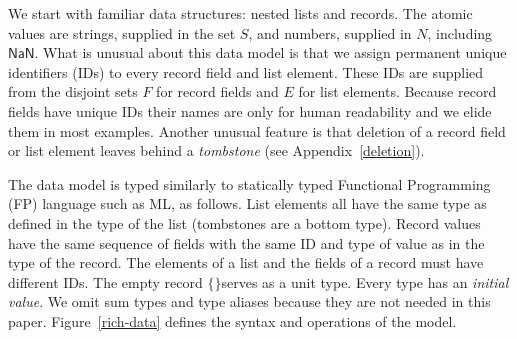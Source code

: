 \documentclass[english,submission]{programming}
\theoremstyle{definition}
\newtheorem*{remark}{Remark}
\newcommand{\mathbox}[1]{\colorbox{black!10}{$#1$\phantom{i\hspace{-3.5pt}}}}
\begin{document}
We start with familiar data structures: nested lists and records. The atomic values are strings, supplied in the set \mathbox{S}, and numbers, supplied in \mathbox{N}, including \mathbox{\textsf{NaN}}. What is unusual about this data model is that we assign permanent unique identifiers (IDs) to every record field and list element. These IDs are supplied from the disjoint sets \mathbox{F} for record fields and \mathbox{E} for list elements. Because record fields have unique IDs their names are only for human readability and we elide them in most examples. Another unusual feature is that deletion of a record field or list element leaves behind a \textit{tombstone} (see Appendix~\ref{deletion}).


The data model is typed similarly to statically typed Functional Programming (FP) language such as ML, as follows. List elements all have the same type as defined in the type of the list (tombstones are a bottom type). Record values have the same sequence of fields with the same ID and type of value as in the type of the record. The elements of a list and the fields of a record must have different IDs.
The empty record \mathbox{\text{\{\}}}serves as a unit type. Every type has an \textit{initial value}.
We omit sum types and type aliases because they are not needed in this paper.
Figure~\ref{rich-data} defines the syntax and operations of the model.
\end{document}
